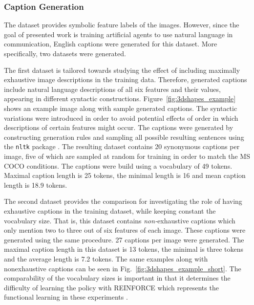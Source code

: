 \subsubsection{Caption Generation}

The dataset provides symbolic feature labels of the images. However, since the goal of presented work is training artificial agents to use natural language in communication, English captions were generated for this dataset. More specifically, two datasets were generated. 

The first dataset is tailored towards studying the effect of including maximally exhaustive image descriptions in the training data. Therefore, generated captions include natural language descriptions of all six features and their values, appearing in different syntactic constructions. Figure~\ref{fig:3dshapes_example} shows an example image along with sample generated captions. The syntactic variations were introduced in order to avoid potential effects of order in which descriptions of certain features might occur.
The captions were generated by constructing generation rules and sampling all possible resulting sentences using the \texttt{nltk} package \parencite{bird2006nltk}. The resulting dataset contains 20 synonymous captions per image, five of which are sampled at random for training in order to match the MS COCO conditions. The captions were build using a vocabulary of 49 tokens. Maximal caption length is 25 tokens, the minimal length is 16 and mean caption length is 18.9 tokens. 

The second dataset provides the comparison for investigating the role of having exhaustive captions in the training dataset, while keeping constant the vocabulary size. That is, this dataset contains \textit{non-}exhaustive captions which only mention two to three out of six features of each image. These captions were generated using the same procedure. 27 captions per image were generated. The maximal caption length in this dataset is 13 tokens, the minimal is three tokens and the average length is 7.2 tokens.
The same examples along with nonexhaustive captions can be seen in Fig.~\ref{fig:3dshapes_example_short}.
The comparability of the vocabulary sizes is important in that it determines the difficulty of learning the policy with REINFORCE which represents the functional learning in these experiments \parencite[cf.][]{havrylov2017emergence}.


